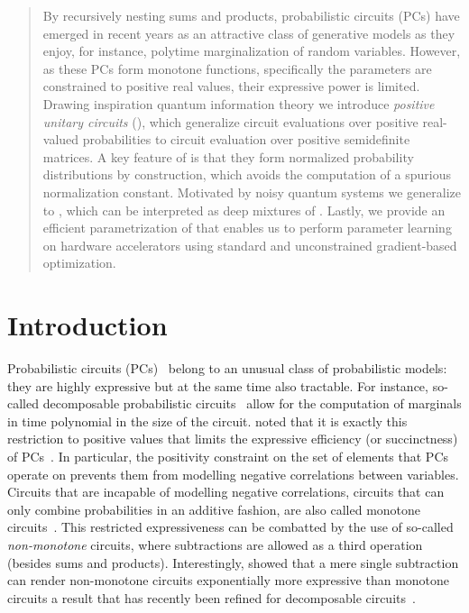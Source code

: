





\begin{abstract}
	By recursively nesting sums and products, probabilistic circuits (PCs) have emerged in recent years as an attractive class of generative models as they enjoy, for instance, polytime marginalization of random variables.
	However, as these PCs form monotone functions, specifically the parameters are constrained to positive real values, their expressive power is limited.
	Drawing inspiration quantum information theory we introduce \textit{positive unitary circuits} (\puncs),
	which generalize circuit evaluations over positive real-valued probabilities to circuit evaluation over positive semidefinite matrices.
	A key feature of \puncs is that they form normalized probability distributions by construction, which avoids the computation of a spurious normalization constant.
	Motivated by noisy quantum systems we generalize \puncs to \noisepuncs, which can be interpreted as deep mixtures of \puncs.
	Lastly, we provide an efficient parametrization of \puncs that enables us to perform parameter learning on hardware accelerators using standard and unconstrained gradient-based optimization.
\end{abstract}




\section{Introduction}


Probabilistic circuits (PCs)~\citep{darwiche2003differential,poon2011sum} belong to an unusual class of probabilistic models: they are highly expressive but at the same time also tractable.
For instance, so-called decomposable probabilistic circuits~\citep{darwiche2001decomposable} allow for the computation of marginals in time polynomial in the size of the circuit.
\citet{zhang2020relationship} noted that it is exactly this restriction to positive values that limits the expressive efficiency (or succinctness) of PCs~\citep{martens2014expressive,decolnet2021compilation}. In particular, the positivity constraint on the set of elements that PCs operate on prevents them from modelling negative correlations between variables.
Circuits that are incapable of modelling negative correlations, \ie circuits that can only combine probabilities in an additive fashion, are also called monotone circuits~\citep{shpilka2010arithmetic}.
This restricted expressiveness can be combatted by the use of so-called \textit{non-monotone} circuits, where subtractions are allowed as a third operation (besides sums and products). Interestingly, \citet{valiant1979negation} showed that a mere single subtraction can render non-monotone circuits exponentially more expressive than monotone circuits a result that has recently been refined for decomposable circuits~\citep{loconte2024sum}.

